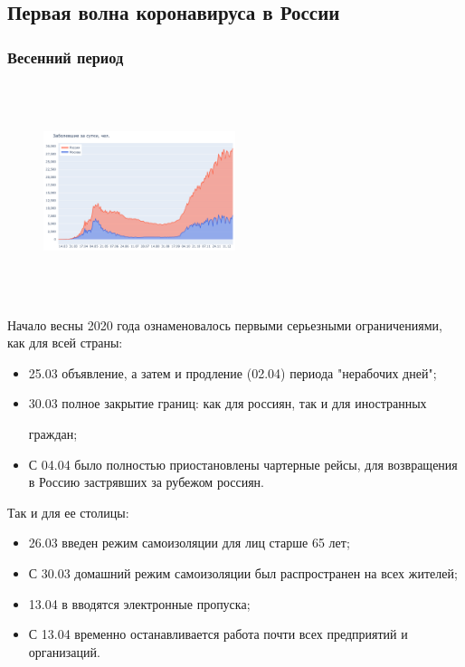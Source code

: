 \documentclass[a4paper, 12pt]{extarticle}
\begin{document}
\newpage

\subsection{Первая волна коронавируса в России}
\subsubsection{Весенний период}

\begin{figure}
    \centering
    \vspace{-20pt}
    \includegraphics[height=180pt, width=0.50\textwidth]{../plots/1day_confirmed_russia_moscow.pdf}
    \label{fig:day_confirmed_russia_moscow}
\end{figure}

Начало весны 2020 года ознаменовалось первыми серьезными ограничениями, как для всей страны:

\begin{itemize}
    \item 25.03 объявление, а затем и продление (02.04) периода
        "нерабочих дней";
    \item 30.03 полное закрытие границ: как для россиян, так и для иностранных

        граждан;
    \item С 04.04 было полностью приостановлены чартерные рейсы, для
        возвращения в Россию застрявших за рубежом россиян.
\end{itemize}
\vspace{4mm}

Так и для ее столицы:

\begin{itemize}
    \item 26.03 введен режим самоизоляции для лиц старше 65 лет;
    \item С 30.03 домашний режим самоизоляции был распространен на
        всех жителей;
    \item 13.04 в вводятся электронные пропуска;
    \item С 13.04 временно останавливается работа почти всех предприятий и
        организаций.
\end{itemize}
\vspace{3mm}
\end{document}
